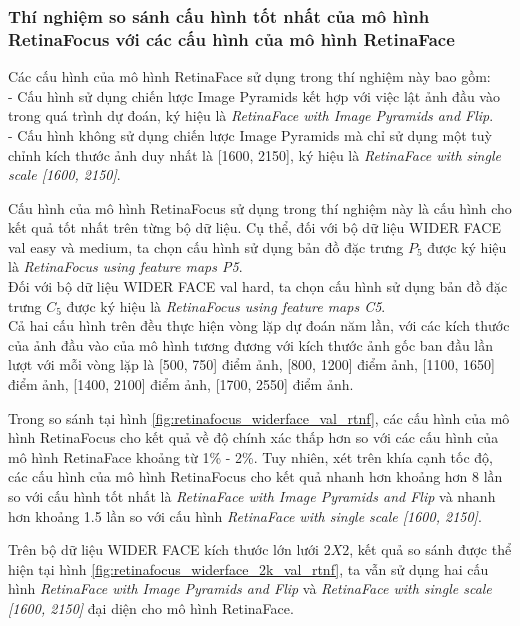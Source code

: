 {    \subsubsection*{Thí nghiệm so sánh cấu hình tốt nhất của mô hình RetinaFocus với các cấu hình của mô hình RetinaFace}
    
    \noindent
    Các cấu hình của mô hình RetinaFace sử dụng trong thí nghiệm này bao gồm: \\
    - Cấu hình sử dụng chiến lược Image Pyramids kết hợp với việc lật ảnh đầu vào trong quá trình dự đoán, ký hiệu là \textit{RetinaFace with Image Pyramids and Flip}. \\
    - Cấu hình không sử dụng chiến lược Image Pyramids mà chỉ sử dụng một tuỳ chỉnh kích thước ảnh duy nhất là [1600, 2150], ký hiệu là \textit{RetinaFace with single scale [1600, 2150]}.

    \noindent
    Cấu hình của mô hình RetinaFocus sử dụng trong thí nghiệm này là cấu hình cho kết quả tốt nhất trên từng bộ dữ liệu.
    Cụ thể, đối với bộ dữ liệu WIDER FACE val easy và medium, ta chọn cấu hình sử dụng bản đồ đặc trưng $P_5$ được ký hiệu là \textit{RetinaFocus using feature maps P5}. \\
    Đối với bộ dữ liệu WIDER FACE val hard, ta chọn cấu hình sử dụng bản đồ đặc trưng $C_5$ được ký hiệu là \textit{RetinaFocus using feature maps C5}. \\
    Cả hai cấu hình trên đều thực hiện vòng lặp dự đoán năm lần, với các kích thước của ảnh đầu vào của mô hình tương đương với kích thước ảnh gốc ban đầu lần lượt với mỗi vòng lặp là [500, 750] điểm ảnh, [800, 1200] điểm ảnh, [1100, 1650] điểm ảnh, [1400, 2100] điểm ảnh, [1700, 2550] điểm ảnh.

    \noindent
    Trong so sánh tại hình \ref{fig:retinafocus_widerface_val_rtnf}, các cấu hình của mô hình RetinaFocus cho kết quả về độ chính xác thấp hơn so với các cấu hình của mô hình RetinaFace khoảng từ 1\% - 2\%.
    Tuy nhiên, xét trên khía cạnh tốc độ, các cấu hình của mô hình RetinaFocus cho kết quả nhanh hơn khoảng hơn 8 lần so với cấu hình tốt nhất là \textit{RetinaFace with Image Pyramids and Flip} và nhanh hơn khoảng 1.5 lần so với cấu hình \textit{RetinaFace with single scale [1600, 2150]}.

    \noindent
    Trên bộ dữ liệu WIDER FACE kích thước lớn lưới $2 X 2$, kết quả so sánh được thể hiện tại hình \ref{fig:retinafocus_widerface_2k_val_rtnf}, ta vẫn sử dụng hai cấu hình \textit{RetinaFace with Image Pyramids and Flip} và \textit{RetinaFace with single scale [1600, 2150]} đại diện cho mô hình RetinaFace.

}
